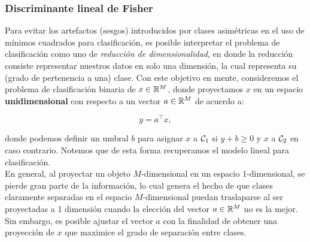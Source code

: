 \subsubsection{Discriminante lineal de Fisher}

Para evitar los artefactos (sesgos) introducidos por clases  asimétricas en el uso de mínimos cuadrados para clasificación, es posible interpretar el problema de clasificación como uno de \emph{reducción de dimensionalidad}, en donde la reducción consiste representar nuestros datos  en solo una dimensión, la cual representa su (grado de pertenencia a una) clase. Con este objetivo en mente, consideremos el problema de clasificación binaria de $x\in \mathbb{R}^M$, donde proyectamos $x$ en un espacio \textbf{unidimensional} con respecto a un vector $a\in\mathbb{R}^M$ de acuerdo a:

\begin{equation}
	y = a^\top x,
\end{equation}

donde podemos definir un umbral $b$ para asignar $x$ a ${\mathcal C}_1$ si $y+b\geq 0$ y $x$ a ${\mathcal C}_2$ en caso contrario. Notemos que de esta forma recuperamos el modelo lineal para clasificación.\\

En general, al proyectar un objeto $M$-dimensional en un espacio  1-dimensional, se pierde gran parte de la información, lo cual genera el hecho de que clases claramente separadas en el espacio $M$-dimensional puedan traslaparse al ser proyectadas a 1 dimensión cuando la elección del vector $a\in\mathbb{R}^M$ no es la mejor. Sin embargo, es posible ajustar el vector $a$ con la finalidad de obtener una proyección de $x$ que maximice el grado de separación entre clases.\\

